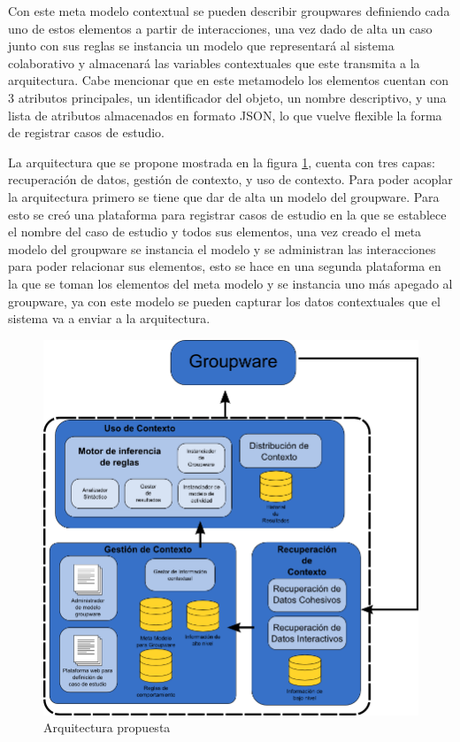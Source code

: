 Con este meta modelo contextual se pueden describir groupwares definiendo cada uno de estos elementos a partir de interacciones, una vez dado de alta un caso junto con sus reglas se instancia un modelo que representar\'a al sistema colaborativo y almacenar\'a las variables contextuales que este transmita a la arquitectura. Cabe mencionar que en este metamodelo los elementos cuentan con 3 atributos principales, un identificador del objeto, un nombre descriptivo, y una lista de atributos almacenados en formato JSON, lo que vuelve flexible la forma de registrar casos de estudio.

La arquitectura que se propone mostrada en la figura \ref{ARCH:propuesta}, cuenta con tres capas: recuperaci\'on de datos, gesti\'on de contexto, y uso de contexto. Para poder acoplar la arquitectura primero se tiene que dar de alta un modelo del groupware. Para esto se cre\'o una plataforma para registrar casos de estudio en la que se establece el nombre del caso de estudio y todos sus elementos, una vez creado el meta modelo del groupware se instancia el modelo y se administran las interacciones para poder relacionar sus elementos, esto se hace en una segunda plataforma en la que se toman los elementos del meta modelo y se instancia uno m\'as apegado al groupware, ya con este modelo se pueden capturar los datos contextuales que el sistema va a enviar a la arquitectura. 

\begin{figure}[h!]
\centering
\includegraphics[scale=0.40]{images/arch2}
\caption{Arquitectura propuesta}
\label{ARCH:propuesta}
\end{figure}

